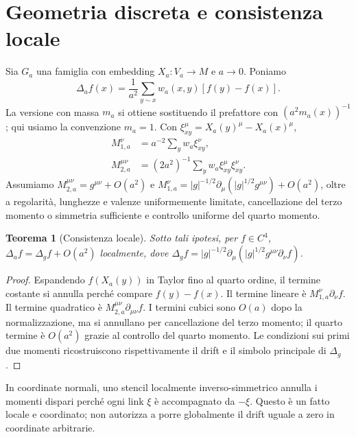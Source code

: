 \documentclass[11pt,a4paper]{article}
\newtheorem{theorem}{Teorema}[section]\newtheorem{lemma}[theorem]{Lemma}\newtheorem{proposition}[theorem]{Proposizione}\newtheorem{corollary}[theorem]{Corollario}\newtheorem{remark}[theorem]{Osservazione}
\begin{document}
\section{Geometria discreta e consistenza locale}
Sia $G_a$ una famiglia con embedding $X_a:V_a\to M$ e $a\to0$. Poniamo
\begin{equation}\Delta_af(x)=\frac1{a^2}\sum_{y\sim x}w_a(x,y)[f(y)-f(x)].\end{equation}
La versione con massa $m_a$ si ottiene sostituendo il prefattore con $(a^2m_a(x))^{-1}$; qui usiamo la convenzione $m_a=1$. Con $\xi_{xy}^\mu=X_a(y)^\mu-X_a(x)^\mu$,
\begin{align}M_{1,a}^\nu&=a^{-2}\sum_yw_a\xi_{xy}^\nu,\\M_{2,a}^{\mu\nu}&=(2a^2)^{-1}\sum_yw_a\xi_{xy}^\mu\xi_{xy}^\nu.\end{align}
Assumiamo $M_{2,a}^{\mu\nu}=g^{\mu\nu}+O(a^2)$ e $M_{1,a}^\nu=|g|^{-1/2}\partial_\mu(|g|^{1/2}g^{\mu\nu})+O(a^2)$, oltre a regolarità, lunghezze e valenze uniformemente limitate, cancellazione del terzo momento o simmetria sufficiente e controllo uniforme del quarto momento.
\begin{theorem}[Consistenza locale]\label{thm:consistency}Sotto tali ipotesi, per $f\in C^4$, $\Delta_af=\Delta_gf+O(a^2)$ localmente, dove $\Delta_gf=|g|^{-1/2}\partial_\mu(|g|^{1/2}g^{\mu\nu}\partial_\nu f)$.
\end{theorem}
\begin{proof}Espandendo $f(X_a(y))$ in Taylor fino al quarto ordine, il termine costante si annulla perché compare $f(y)-f(x)$. Il termine lineare è $M_{1,a}^\nu\partial_\nu f$. Il termine quadratico è $M_{2,a}^{\mu\nu}\partial_{\mu\nu}f$. I termini cubici sono $O(a)$ dopo la normalizzazione, ma si annullano per cancellazione del terzo momento; il quarto termine è $O(a^2)$ grazie al controllo del quarto momento. Le condizioni sui primi due momenti ricostruiscono rispettivamente il drift e il simbolo principale di $\Delta_g$.\end{proof}
In coordinate normali, uno stencil localmente inverso-simmetrico annulla i momenti dispari perché ogni link $\xi$ è accompagnato da $-\xi$. Questo è un fatto locale e coordinato; non autorizza a porre globalmente il drift uguale a zero in coordinate arbitrarie.
\end{document}
